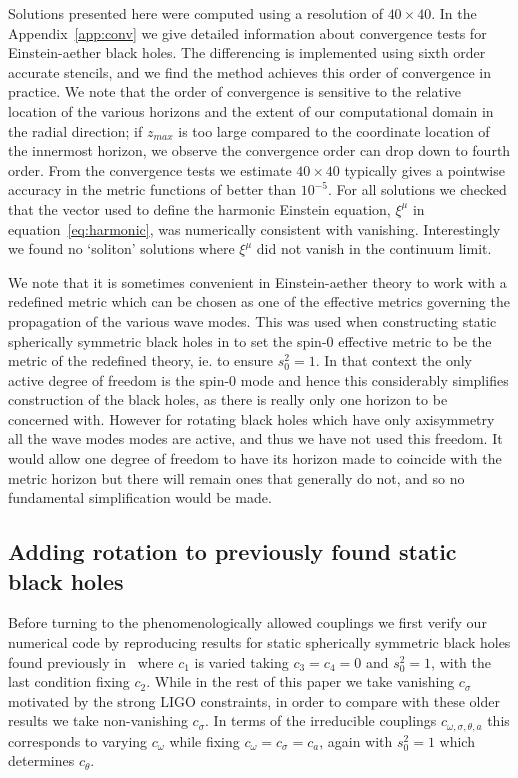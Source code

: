 \documentclass[12pt]{article}
\numberwithin{equation}{section}
\begin{document}
Solutions presented here were computed using a resolution of $40 \times 40$. 
In the Appendix~\ref{app:conv} we give detailed information about convergence tests for Einstein-aether black holes. 
The differencing is implemented using sixth order accurate stencils, and we find the method achieves this order of convergence in practice. We note that the order of convergence is sensitive to the relative location of the various horizons and the extent of our computational domain in the radial direction; if $z_{max}$ is too large compared to the coordinate location of the innermost horizon, we observe the convergence order can drop down to fourth order.
From the convergence tests we estimate $40 \times 40$ typically gives a pointwise accuracy in the metric functions of better than $10^{-5}$. 
For all solutions we checked that the vector used to define the harmonic Einstein equation, $\xi^\mu$ in equation~\eqref{eq:harmonic}, was numerically consistent with vanishing. Interestingly we found no `soliton' solutions where $\xi^\mu$ did not vanish in the continuum limit. 

We note that it is sometimes convenient in Einstein-aether theory to work with a redefined metric which can be chosen as one of the effective metrics governing the propagation of the various wave modes. This was used when constructing static spherically symmetric black holes in \cite{Eling:2006ec,Barausse:2011pu} to set the spin-0 effective metric to be the metric of the redefined theory, ie. to ensure $s_0^2 = 1$. In that context the only active degree of freedom is the spin-0 mode and hence this considerably simplifies construction of the black holes, as there is really only one horizon to be concerned with. However for rotating black holes which have only axisymmetry all the wave modes modes are active, and thus we have not used this freedom. It would allow one degree of freedom to have its horizon made to coincide with the metric horizon but there will remain ones that generally do not, and so no fundamental simplification would be made. 




\subsection{Adding rotation to previously found static black holes}

Before turning to the phenomenologically allowed couplings we first verify our numerical code by reproducing results for static spherically symmetric black holes found previously in~\cite{Eling:2006ec,Barausse:2011pu} where $c_1$ is varied taking $c_3 = c_4 = 0$ and $s_0^2 = 1$, with the last condition fixing $c_2$. While in the rest of this paper we take vanishing $c_\sigma$ motivated by the strong LIGO constraints, in order to compare with these older results we take non-vanishing $c_\sigma$.
In terms of the irreducible couplings $c_{\omega,\sigma,\theta,a}$ this corresponds to varying $c_\omega$ while fixing $c_\omega = c_\sigma = c_a$, again with $s_0^2 = 1$ which determines $c_\theta$.
\end{document}
